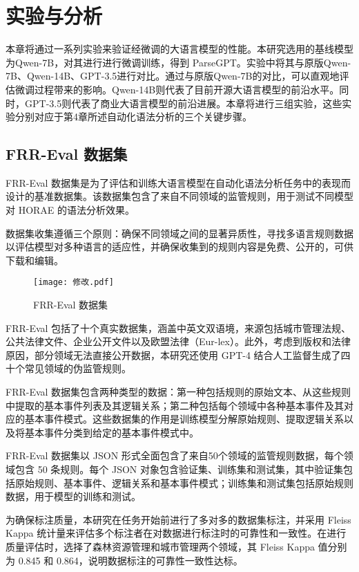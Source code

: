 \newpage

\section{实验与分析}

本章将通过一系列实验来验证经微调的大语言模型的性能。本研究选用的基线模型为Qwen-7B，对其进行进行微调训练，得到 ParseGPT。实验中将其与原版Qwen-7B、Qwen-14B、GPT-3.5\cite{koubaa2023gpt}进行对比。通过与原版Qwen-7B的对比，可以直观地评估微调过程带来的影响。Qwen-14B则代表了目前开源大语言模型的前沿水平。同时，GPT-3.5则代表了商业大语言模型的前沿进展。本章将进行三组实验，这些实验分别对应于第4章所述自动化语法分析的三个关键步骤。

\subsection{FRR-Eval 数据集}

FRR-Eval 数据集是为了评估和训练大语言模型在自动化语法分析任务中的表现而设计的基准数据集。该数据集包含了来自不同领域的监管规则，用于测试不同模型对 HORAE 的语法分析效果。

数据集收集遵循三个原则：确保不同领域之间的显著异质性，寻找多语言规则数据以评估模型对多种语言的适应性，并确保收集到的规则内容是免费、公开的，可供下载和编辑。

\begin{figure*}[ht]
    \centering
    \texttt{[image: 修改.pdf]}
    \caption{FRR-Eval 数据集}
\end{figure*}

FRR-Eval 包括了十个真实数据集，涵盖中英文双语境，来源包括城市管理法规、公共法律文件、企业公开文件以及欧盟法律（Eur-lex）。此外，考虑到版权和法律原因，部分领域无法直接公开数据，本研究还使用 GPT-4 结合人工监督生成了四十个常见领域的伪监管规则。

FRR-Eval 数据集包含两种类型的数据：第一种包括规则的原始文本、从这些规则中提取的基本事件列表及其逻辑关系；第二种包括每个领域中各种基本事件及其对应的基本事件模式。这些数据集的作用是训练模型分解原始规则、提取逻辑关系以及将基本事件分类到给定的基本事件模式中。

FRR-Eval 数据集以 JSON 形式全面包含了来自50个领域的监管规则数据，每个领域包含 50 条规则。每个 JSON 对象包含验证集、训练集和测试集，其中验证集包括原始规则、基本事件、逻辑关系和基本事件模式；训练集和测试集包括原始规则数据，用于模型的训练和测试。

为确保标注质量，本研究在任务开始前进行了多对多的数据集标注，并采用 Fleiss Kappa\cite{falotico2015fleiss} 统计量来评估多个标注者在对数据进行标注时的可靠性和一致性。在进行质量评估时，选择了森林资源管理和城市管理两个领域，其 Fleiss Kappa 值分别为 0.845 和 0.864，说明数据标注的可靠性一致性达标。

